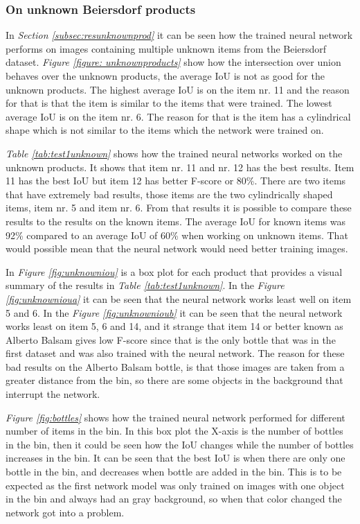 \subsubsection{On unknown Beiersdorf products}
In \textit{Section \ref{subsec:resunknownprod}} it can be seen how the trained neural network performs on images containing multiple unknown items from the Beiersdorf dataset. \textit{Figure \ref{figure: unknownproducts}} show how the intersection over union behaves over the unknown products, the average IoU is not as good for the unknown products. The highest average IoU is on the item nr. 11 and the reason for that is that the item is similar to the items that were trained. The lowest average IoU is on the item nr. 6. The reason for that is the item has a cylindrical shape which is not similar to the items which the network were trained on.  

\textit{Table \ref{tab:test1unknown}} shows how the trained neural networks worked on the unknown products. It shows that item nr. 11 and nr. 12 has the best results. Item 11 has the best IoU but item 12 has better F-score or 80\%. There are two items that have extremely bad results, those items are the two cylindrically shaped items, item nr. 5 and item nr. 6. From that results it is possible to compare these results to the results on the known items. The average IoU for known items was 92\% compared to an average IoU of 60\% when working on unknown items. That would possible mean that the neural network would need better training images. 

In \textit{Figure \ref{fig:unknowniou}} is a box plot for each product that provides a visual summary of the results in \textit{Table \ref{tab:test1unknown}}. In the \textit{Figure \ref{fig:unknownioua}} it can be seen that the neural network works least well on item 5 and 6. In the \textit{Figure \ref{fig:unknownioub}} it can be seen that the neural network works least on item 5, 6 and 14, and it strange that item 14 or better known as Alberto Balsam gives low F-score since that is the only bottle that was in the first dataset and was also trained with the neural network. The reason for these bad results on the Alberto Balsam bottle, is that those images are taken from a greater distance from the bin, so there are some objects in the background that interrupt the network. 

\textit{Figure \ref{fig:bottles}} shows how the trained neural network performed for different number of items in the bin. In this box plot the X-axis is the number of bottles in the bin, then it could be seen how the IoU changes while the number of bottles increases in the bin. It can be seen that the best IoU is when there are only one bottle in the bin, and decreases when bottle are added in the bin. This is to be expected as the first network model was only trained on images with one object in the bin and always had an gray background, so when that color changed the network got into a problem.


